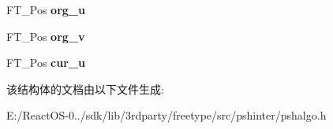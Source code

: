 \begin{DoxyCompactItemize}
\item 
\mbox{\label{struct_p_s_h___point_rec___a360fd71c553c9868575458592ef8cb40}} 
F\+T\+\_\+\+Pos {\bfseries org\+\_\+u}
\item 
\mbox{\label{struct_p_s_h___point_rec___a94acbecbc9fa199392195078878e59d1}} 
F\+T\+\_\+\+Pos {\bfseries org\+\_\+v}
\item 
\mbox{\label{struct_p_s_h___point_rec___a56b8b9f6144f07a636ad406f363abce8}} 
F\+T\+\_\+\+Pos {\bfseries cur\+\_\+u}
\end{DoxyCompactItemize}


该结构体的文档由以下文件生成\+:\begin{DoxyCompactItemize}
\item 
E\+:/\+React\+O\+S-\/0../sdk/lib/3rdparty/freetype/src/pshinter/pshalgo.\+h\end{DoxyCompactItemize}
